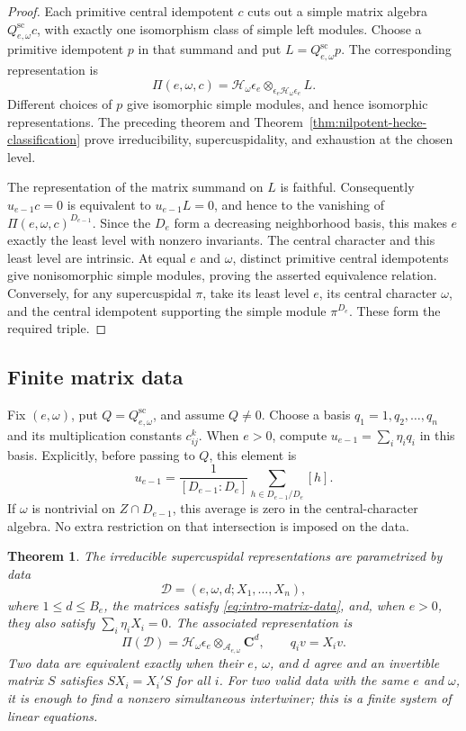 \documentclass[10pt,letterpaper]{amsart}
\numberwithin{equation}{section}
\newtheorem{theorem}{Theorem}[section]
\theoremstyle{remark}
\newcommand{\C}{\mathbf C}
\begin{document}
\begin{proof}
Each primitive central idempotent $c$ cuts out a simple matrix algebra
$Q^{\mathrm{sc}}_{e,\omega}c$, with exactly one isomorphism class of
simple left modules. Choose a primitive idempotent $p$ in that summand
and put $L=Q^{\mathrm{sc}}_{e,\omega}p$. The corresponding representation
is
\[
 \Pi(e,\omega,c)
 =\mathcal H_\omega\epsilon_e
      \otimes_{\epsilon_e\mathcal H_\omega\epsilon_e}L.
\]
Different choices of $p$ give isomorphic simple modules, and hence
isomorphic representations. The preceding theorem and
Theorem~\ref{thm:nilpotent-hecke-classification} prove irreducibility,
supercuspidality, and exhaustion at the chosen level.

The representation of the matrix summand on $L$ is faithful. Consequently
$u_{e-1}c=0$ is equivalent to $u_{e-1}L=0$, and hence to the vanishing
of $\Pi(e,\omega,c)^{D_{e-1}}$. Since the $D_e$ form a decreasing
neighborhood basis, this makes $e$ exactly the least level with nonzero
invariants. The central character and this least level are intrinsic.
At equal $e$ and $\omega$, distinct primitive central idempotents give
nonisomorphic simple modules, proving the asserted equivalence relation.
Conversely, for any supercuspidal $\pi$, take its least level $e$, its
central character $\omega$, and the central idempotent supporting the
simple module $\pi^{D_e}$. These form the required triple.
\end{proof}



\subsection{Finite matrix data}

Fix $(e,\omega)$, put $Q=Q^{\mathrm{sc}}_{e,\omega}$, and assume $Q\ne0$.
Choose a basis $q_1=1,q_2,\ldots,q_n$ and its multiplication constants
$c_{ij}^k$. When $e>0$, compute $u_{e-1}=\sum_i\eta_iq_i$ in this basis.
Explicitly, before passing to $Q$, this element is
\[
 u_{e-1}=\frac{1}{[D_{e-1}:D_e]}
             \sum_{h\in D_{e-1}/D_e}[h].
\]
If $\omega$ is nontrivial on $Z\cap D_{e-1}$, this average is zero in
the central-character algebra. No extra restriction on that intersection
is imposed on the data.

\begin{theorem}\label{thm:matrix-parameters}
The irreducible supercuspidal representations are parametrized by data
\[
 \mathcal D=(e,\omega,d;X_1,\ldots,X_n),
\]
where $1\le d\le B_e$, the matrices satisfy
\eqref{eq:intro-matrix-data}, and, when $e>0$, they also satisfy
$\sum_i\eta_iX_i=0$. The associated representation is
\begin{equation}\label{eq:matrix-realization}
 \Pi(\mathcal D)=\mathcal H_\omega\epsilon_e
       \otimes_{\mathcal A_{e,\omega}}\C^d,
 \qquad q_i v=X_i v.
\end{equation}
Two data are equivalent exactly when their $e$, $\omega$, and $d$ agree
and an invertible matrix $S$ satisfies $SX_i=X_i'S$ for all $i$.
For two valid data with the same $e$ and $\omega$, it is enough to find a
nonzero simultaneous intertwiner; this is a finite system of linear equations.
\end{theorem}
\end{document}
